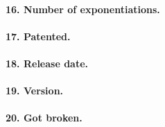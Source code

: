 \documentclass[../report.tex]{subfiles}
\begin{document}
\paragraph{16. Number of exponentiations.}


\paragraph{17. Patented.}


\paragraph{18. Release date.}


\paragraph{19. Version.}


\paragraph{20. Got broken.}
\end{document}
